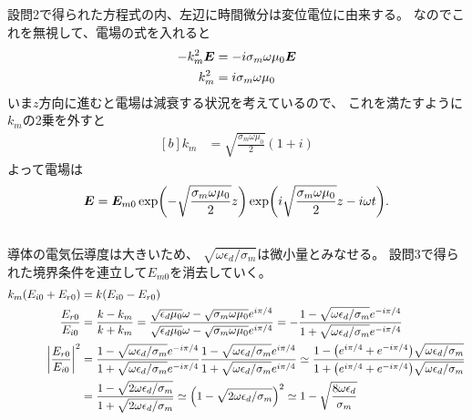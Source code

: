 \documentclass[../../sp_2013.tex]{subfiles}
\begin{document}
\subsection{}
設問2で得られた方程式の内、左辺に時間微分は変位電位に由来する。
なのでこれを無視して、電場の式を入れると
\begin{equation}\begin{aligned}[b]
    -k_m^2 \vb*{E} &= -i\sigma_m\omega \mu_0 \vb*{E}\\
    k_m^2 &= i\sigma_m\omega\mu_0
\end{aligned}\end{equation}
いま\(z\)方向に進むと電場は減衰する状況を考えているので、
これを満たすように\(k_m\)の2乗を外すと
\begin{equation}\begin{aligned}[b]
    k_m &= \sqrt{\frac{\sigma_m \omega \mu_0}{2}}(1+i)
\end{aligned}\end{equation}
よって電場は
\begin{equation}\begin{aligned}[b]
    \vb*{E} = \vb*{E}_{m0}\exp(-\sqrt{\frac{\sigma_m \omega \mu_0}{2}}z)\exp(i\sqrt{\frac{\sigma_m \omega \mu_0}{2}}z-i\omega t).
\end{aligned}\end{equation}

\subsection{}
導体の電気伝導度は大きいため、
\(\sqrt{\omega\epsilon_d/\sigma_m}\)は微小量とみなせる。
設問3で得られた境界条件を連立して\(E_{m0}\)を消去していく。
\begin{equation}\begin{aligned}[b]
    k_m(E_{i0}+E_{r0})&=k(E_{i0}-E_{r0})\\
    \frac{E_{r0}}{E_{i0}} &= \frac{k-k_m}{k+k_m}
    =\frac{\sqrt{\epsilon_d\mu_0}\omega-\sqrt{\sigma_m\omega\mu_0}e^{i\pi/4}}{\sqrt{\epsilon_d\mu_0}\omega-\sqrt{\sigma_m\omega\mu_0}e^{i\pi/4}}
    = - \frac{1-\sqrt{\omega\epsilon_d/\sigma_m}e^{-i\pi/4}}{1+\sqrt{\omega\epsilon_d/\sigma_m}e^{-i\pi/4}}\\
    \abs{\frac{E_{r0}}{E_{i0}}}^2
    &= \frac{1-\sqrt{\omega\epsilon_d/\sigma_m}e^{-i\pi/4}}{1+\sqrt{\omega\epsilon_d/\sigma_m}e^{-i\pi/4}}
    \frac{1-\sqrt{\omega\epsilon_d/\sigma_m}e^{i\pi/4}}{1+\sqrt{\omega\epsilon_d/\sigma_m}e^{i\pi/4}}
    \simeq \frac{1-\qty(e^{i\pi/4}+e^{-i\pi/4})\sqrt{\omega\epsilon_d/\sigma_m}}{1+\qty(e^{i\pi/4}+e^{-i\pi/4})\sqrt{\omega\epsilon_d/\sigma_m}}\\
    &=\frac{1-\sqrt{2\omega\epsilon_d/\sigma_m}}{1+\sqrt{2\omega\epsilon_d/\sigma_m}}
    \simeq \qty(1-\sqrt{2\omega\epsilon_d/\sigma_m})^2
    \simeq 1-\sqrt{\frac{8\omega\epsilon_d}{\sigma_m}}
\end{aligned}\end{equation}
\end{document}

